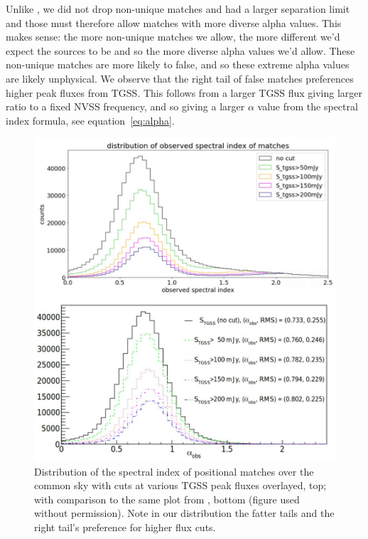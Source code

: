 \documentclass[12pt,a4paper]{article}
\begin{document}
Unlike \citet{posmatchpaper}, we did not drop non-unique matches and had a larger separation limit and those must therefore allow matches with more diverse alpha values. This makes sense: the more non-unique matches we allow, the more different we'd expect the sources to be and so the more diverse alpha values we'd allow. These non-unique matches are more likely to false, and so these extreme alpha values are likely unphysical.
We observe that the right tail of false matches preferences higher peak fluxes from TGSS. This follows from a larger TGSS flux giving larger ratio to a fixed NVSS frequency, and so giving a larger $\alpha$ value from the spectral index formula, see equation~\ref{eq:alpha}.\\

\begin{figure}[H]
    \centering
    \includegraphics[width=\textwidth]{pics/hist_alpha_comparison-cropped.pdf}
    \caption{Distribution of the spectral index of positional matches over the common sky with cuts at various TGSS peak fluxes overlayed, top; with comparison to the same plot from \citet{posmatchpaper}, bottom (figure used without permission). Note in our distribution the fatter tails and the right tail's preference for higher flux cuts.}
    \label{fig:hist_alpha_comparison}
\end{figure}
\end{document}
